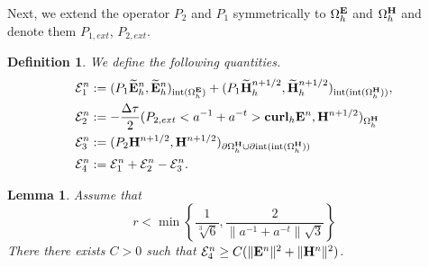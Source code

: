 \documentclass[12pt,reqno]{amsart}
\newcommand{\curl}{{\bf curl}}
\newcommand{\e}{{\bf E}}
\newcommand{\h}{{\bf H}}
\newtheorem{lem}[theorem]{Lemma}
\newtheorem{defi}[theorem]{Definition}
\theoremstyle{definition}
\numberwithin{equation}{section}
\newcommand{\intr}[1]{\mathrm{int}(#1)}
\def\Gwh{\Omega_h}
\begin{document}
		Next, we extend the operator $P_2$ and $P_1$ symmetrically  to $\Gwh^{\e}$ and 
$\Gwh^{\h}$ and denote them $P_{1,ext}$, $P_{2,ext}$.
\begin{defi}

	We define the following quantities.
	\begin{align*}
		&
		\mathcal{E}_1^{n}:=
		(P_1\widetilde{\e}_h^{n},\widetilde{\e}_h^{n})_{\intr{\Gwh^\e}}+
		(P_1\widetilde{\h}_h^{n+1/2},\widetilde{\h}_h^{n+1/2})_{\intr{\intr{\Gwh^\h}}}, \\&
		\mathcal{E}_2^{n}:=-\frac{\Delta \tau}{2}(P_{2,ext}<a^{-1}+a^{-t}>\curl_h \e^{n},\h^{n+1/2})_{\Gwh^\h}\\&
		\mathcal{E}_3^{n}:=(P_{2}\h^{n+1/2},\h^{n+1/2})_{\partial \Gwh^\h\cup \partial \intr{\intr{\Gwh^\h}}}\\&
		\mathcal{E}_4^{n}:=\mathcal{E}^n_1+\mathcal{E}^n_2-\mathcal{E}^n_3.
	\end{align*}
\end{defi}
\begin{lem}\label{lem:first}
	Assume that 
	$$
	r<\min \left \{  \frac{1}{\sqrt[3]{6}},\frac{2}{\|a^{-1}+a^{-t}\|\sqrt{3}}  \right \}
	$$
	There there exists $C>0$ such that  
	$\mathcal{E}_4^n\geq C(\|\e^n\|^2+\|\h^n\|^2) $.
\end{lem}
\end{document}
